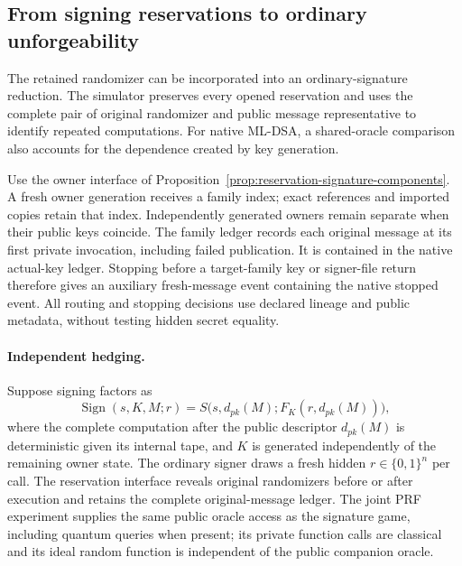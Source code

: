 \subsection{From signing reservations to ordinary unforgeability}
\label{sec:reservation-ordinary-bridge}

The retained randomizer can be incorporated into an ordinary-signature
reduction. The simulator preserves every opened reservation and uses the
complete pair of original randomizer and public message representative to
identify repeated computations. For native ML-DSA, a shared-oracle
comparison also accounts for the dependence created by key generation.

Use the owner interface of
Proposition~\ref{prop:reservation-signature-components}. A fresh owner
generation receives a family index; exact references and imported copies
retain that index. Independently generated owners remain separate when
their public keys coincide. The family ledger records each original
message at its first private invocation, including failed publication.
It is contained in the native actual-key ledger. Stopping before a
target-family key or signer-file return therefore gives an auxiliary
fresh-message event containing the native stopped event. All routing and
stopping decisions use declared lineage and public metadata, without
testing hidden secret equality.

\paragraph{Independent hedging.}
Suppose signing factors as
\[
 \operatorname{Sign}(s,K,M;r)
 =S\bigl(s,d_{pk}(M);F_K(r,d_{pk}(M))\bigr),
\]
where the complete computation after the public descriptor $d_{pk}(M)$
is deterministic given its internal tape, and $K$ is generated
independently of the remaining owner state. The ordinary signer draws a
fresh hidden $r\in\{0,1\}^n$ per call. The reservation interface reveals
original randomizers before or after execution and retains the complete
original-message ledger. The joint PRF experiment supplies the same public
oracle access as the signature game, including quantum queries when
present; its private function calls are classical and its ideal random
function is independent of the public companion oracle.

